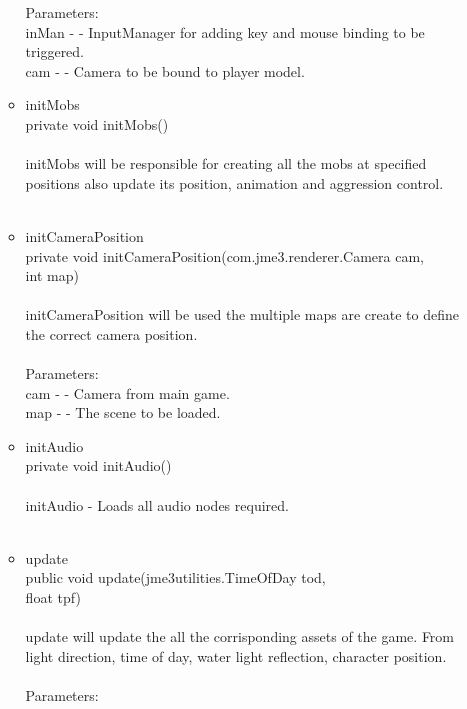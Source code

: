 \documentclass[letterpaper]{article}
\begin{document}
\begin{itemize}
\begin{itemize}
															Parameters: \\
															inMan - - InputManager for adding key and mouse binding to be triggered. \\
															cam - - Camera to be bound to player model.\\
													\item	initMobs \\
															private void initMobs() \\ \\
															initMobs will be responsible for creating all the mobs at specified positions also update its position, animation and aggression control. \\ \\
													\item	initCameraPosition \\
															private void initCameraPosition(com.jme3.renderer.Camera cam, \\
						                      int map) \\ \\
															initCameraPosition will be used the multiple maps are create to define the correct camera position. \\ \\
															Parameters: \\
															cam - - Camera from main game. \\
															map - - The scene to be loaded. \\
													\item	initAudio \\
															private void initAudio() \\ \\
															initAudio - Loads all audio nodes required. \\ \\
													\item	update \\
															public void update(jme3utilities.TimeOfDay tod, \\
						          float tpf) \\ \\
															update will update the all the corrisponding assets of the game. From light direction, time of day, water light reflection, character position. \\ \\
															Parameters: \\

\end{itemize}
\end{itemize}
\end{document}
